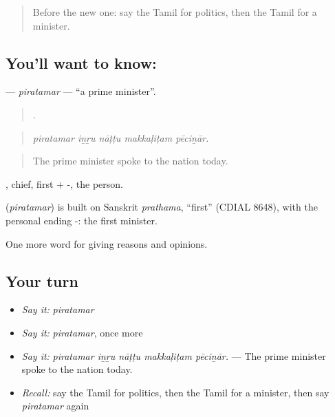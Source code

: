 \label{lesson:TA-C373-piratamar}



\begin{quote}
Before the new one: say the Tamil for politics, then the Tamil for a minister.
\end{quote}

\subsection*{You'll want to know: }
\textbf{} — \emph{piratamar} — \textquotedblleft{}a prime minister\textquotedblright{}.

\begin{quote}
    .
\end{quote}

\begin{quote}
\emph{piratamar iṉṟu nāṭṭu makkaḷiṭam pēciṉār.}
\end{quote}

\begin{quote}
The prime minister spoke to the nation today.
\end{quote}

, chief, first + -, the person.

\begin{cousinweb}
\textbf{} (\emph{piratamar}) is built on Sanskrit \emph{prathama}, \textquotedblleft{}first\textquotedblright{} (CDIAL 8648), with the personal ending -: the first minister.
\end{cousinweb}

\begin{grammarlens}[title={What you've built}]
One more word for giving reasons and opinions.
\end{grammarlens}

\subsection*{Your turn}
\begin{itemize}
\raggedright
  \item \emph{Say it:} \emph{piratamar}
  \item \emph{Say it:} \emph{piratamar}, once more
  \item \emph{Say it:} \emph{piratamar iṉṟu nāṭṭu makkaḷiṭam pēciṉār.} — The prime minister spoke to the nation today.
  \item \emph{Recall:} say the Tamil for politics, then the Tamil for a minister, then say \emph{piratamar} again
\end{itemize}

